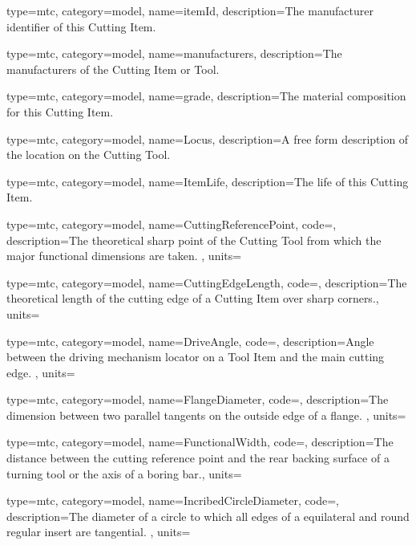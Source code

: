 {
  type=mtc,
  category=model,
  name={itemId},
  description={The manufacturer identifier of this Cutting Item. }
}


{
  type=mtc,
  category=model,
  name={manufacturers},
  description={The manufacturers of the Cutting Item or Tool. }
}


{
  type=mtc,
  category=model,
  name={grade},
  description={The material composition for this Cutting Item.}
}



{
  type=mtc,
  category=model,
  name={Locus},
  description={A free form description of the location on the Cutting Tool.}
}


{
  type=mtc,
  category=model,
  name={ItemLife},
  description={The life of this Cutting Item.}
}


{
  type=mtc,
  category=model,
  name={CuttingReferencePoint},
  code=,
  description={The theoretical sharp point of the Cutting Tool from which the major functional dimensions are taken. },
  units=
}


{
  type=mtc,
  category=model,
  name={CuttingEdgeLength},
  code=,
  description={The theoretical length of the cutting edge of a Cutting Item over sharp corners.},
  units=
}


{
  type=mtc,
  category=model,
  name={DriveAngle},
  code=,
  description={Angle between the driving mechanism locator on a Tool Item and the main cutting edge. },
  units=
}


{
  type=mtc,
  category=model,
  name={FlangeDiameter},
  code=,
  description={The dimension between two parallel tangents on the outside edge of a flange. },
  units=
}


{
  type=mtc,
  category=model,
  name={FunctionalWidth},
  code=,
  description={The distance between the cutting reference point and the rear backing surface of a turning tool or the axis of a boring bar.},
  units=
}


{
  type=mtc,
  category=model,
  name={IncribedCircleDiameter},
  code=,
  description={The diameter of a circle to which all edges of a equilateral and round regular insert are tangential. },
  units=
}


